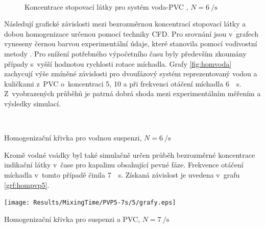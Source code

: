 \begin{figure}[h!]
 \centering

  \qquad             
  \\
  \qquad
  \caption{Koncentrace stopovací látky pro systém voda-PVC , $N=\SI{6}{\per\second}$}
  \label{fig:t}
\end{figure}

Následují grafické závislosti mezi bezrozměrnou koncentrací stopovací látky a dobou homogenizace určenou pomocí techniky CFD. Pro srovnání jsou v~grafech vyneseny černou barvou experimentální údaje, které stanovila pomocí vodivostní metody \citet{pav11}. Pro snížení potřebného výpočetního času byly především zkoumány případy s~vyšší hodnotou rychlosti rotace míchadla. Grafy \ref{fig:homvoda} zachycují výše zmíněné závislosti pro dvoufázový systém reprezentovaný vodou a kuličkami z~PVC o~koncentraci 5, 10 a  při frekvenci otáčení míchadla \SI{6}{\per\second}. Z~vyobrazených průběhů je patrná dobrá shoda mezi experimentálním měřením a výsledky simulací.

\begin{grf}[h!]
 \centering
  \\ 
\end{grf}
\newpage

\begin{grf}[t!]
  \addtocounter{subgrf}{2}
  \centering
  \caption{Homogenizační křivka pro vodnou suspenzi, $N=\SI{6}{\per\second}$}
  \label{fig:homvoda}
\end{grf}
\noindent Kromě vodné vsádky byl také simulačně určen průběh bezrozměrné koncentrace indikační látky v~čase pro kapalinu \pvpP{} obsahující  pevné fáze. Frekvence otáčení míchadla v~tomto případě činila \SI{7}{\per\second}. Získaná závislost je uvedena v~grafu \ref{grf:hompvp5}.
\begin{grf}[h!]
 \centering 
  \texttt{[image: Results/MixingTime/PVP5-7s/5/grafy.eps]}
  \caption{Homogenizační křivka pro suspenzi \pvpP{} a  PVC, $N=\SI{7}{\per\second}$}
  \label{grf:hompvp5}
\end{grf}
\newpage

